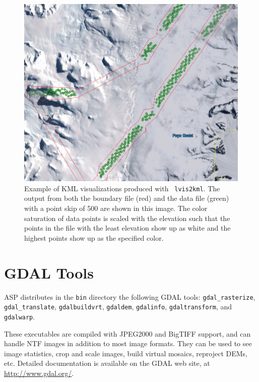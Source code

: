 \begin{figure}[!b]
  \begin{center}
  \includegraphics[width=6in]{images/lvis2kml_snap.png}
  \end{center}
  \caption{ Example of \ac{KML} visualizations produced with {\tt
      lvis2kml}.  The output from both the boundary file (red) and the data file
      (green) with a point skip of 500 are shown in this image.  The color saturation of
      data points is scaled with the elevation such that the points in the file with the least
      elevation show up as white and the highest points show up as the specified color.}
  \label{fig:lvis2kml_example}
\end{figure}


\section{GDAL Tools}

ASP distributes in the \texttt{bin} directory the following GDAL tools:
\texttt{gdal\_rasterize}, \texttt{gdal\_translate}, \texttt{gdalbuildvrt},
\texttt{gdaldem}, \texttt{gdalinfo}, \texttt{gdaltransform}, and
\texttt{gdalwarp}.

These executables are compiled with
JPEG2000 and BigTIFF support, and can handle NTF images in addition to
most image formats.  They can be used to see image statistics, crop and
scale images, build virtual mosaics, reproject DEMs, etc. Detailed
documentation is available on the GDAL web site, at
\url{http://www.gdal.org/}.
